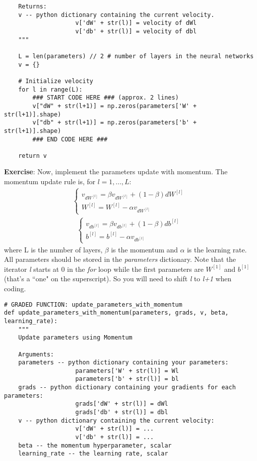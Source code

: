 {\begin{verbatim}
    Returns:
    v -- python dictionary containing the current velocity.
                    v['dW' + str(l)] = velocity of dWl
                    v['db' + str(l)] = velocity of dbl
    """
    
    L = len(parameters) // 2 # number of layers in the neural networks
    v = {}
    
    # Initialize velocity
    for l in range(L):
        ### START CODE HERE ### (approx. 2 lines)
        v["dW" + str(l+1)] = np.zeros(parameters['W' + str(l+1)].shape)
        v["db" + str(l+1)] = np.zeros(parameters['b' + str(l+1)].shape)
        ### END CODE HERE ###
        
    return v
\end{verbatim}


{\textbf{Exercise}}:  Now, implement the parameters update with momentum. The momentum update rule is, for $l = 1, ..., L$: 
\begin{align}
\begin{cases}
v_{dW^{[l]}} = \beta v_{dW^{[l]}} + (1 - \beta) dW^{[l]} \\
W^{[l]} = W^{[l]} - \alpha v_{dW^{[l]}}
\end{cases}
\end{align}
\begin{align}
\begin{cases}
v_{db^{[l]}} = \beta v_{db^{[l]}} + (1 - \beta) db^{[l]} \\
b^{[l]} = b^{[l]} - \alpha v_{db^{[l]}} 
\end{cases}
\end{align}
where L is the number of layers, $\beta$ is the momentum and $\alpha$ is the learning rate. All parameters should be stored in the \emph{parameters} dictionary.  Note that the iterator \emph{l} starts at 0 in the \emph{for} loop while the first parameters are $W^{[1]}$ and $b^{[1]}$ (that's a ``one" on the superscript). So you will need to shift \emph{l} to \emph{l+1} when coding.

\begin{verbatim}
# GRADED FUNCTION: update_parameters_with_momentum
def update_parameters_with_momentum(parameters, grads, v, beta, learning_rate):
    """
    Update parameters using Momentum
    
    Arguments:
    parameters -- python dictionary containing your parameters:
                    parameters['W' + str(l)] = Wl
                    parameters['b' + str(l)] = bl
    grads -- python dictionary containing your gradients for each parameters:
                    grads['dW' + str(l)] = dWl
                    grads['db' + str(l)] = dbl
    v -- python dictionary containing the current velocity:
                    v['dW' + str(l)] = ...
                    v['db' + str(l)] = ...
    beta -- the momentum hyperparameter, scalar
    learning_rate -- the learning rate, scalar
    

\end{verbatim}}
